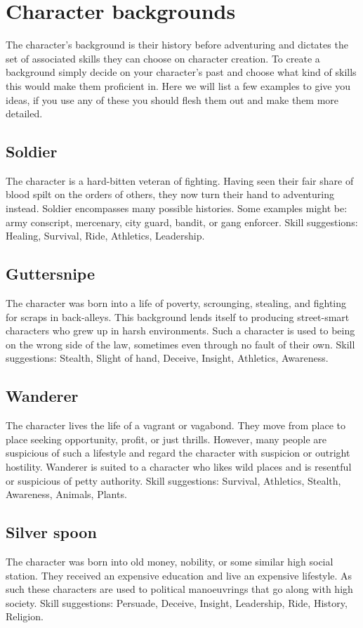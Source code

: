 \documentclass[a4paper,10pt,oneside]{book}
\begin{document}
\section{Character backgrounds}
\label{sec:backgrounds}
The character's background is their history before adventuring and dictates the set of associated skills they can choose on character creation. To create a background simply decide on your character's past and choose what kind of skills this would make them proficient in. Here we will list a few examples to give you ideas, if you use any of these you should flesh them out and make them more detailed.

\subsection{Soldier}
The character is a hard-bitten veteran of fighting. Having seen their fair share of blood spilt on the orders of others, they now turn their hand to adventuring instead. Soldier encompasses many possible histories. Some examples might be: army conscript, mercenary, city guard, bandit, or gang enforcer. Skill suggestions: Healing, Survival, Ride, Athletics, Leadership. 

\subsection{Guttersnipe}
The character was born into a life of poverty, scrounging, stealing, and fighting for scraps in back-alleys. This background lends itself to producing street-smart characters who grew up in harsh environments. Such a character is used to being on the wrong side of the law, sometimes even through no fault of their own. Skill suggestions: Stealth, Slight of hand, Deceive, Insight, Athletics, Awareness.

\subsection{Wanderer}
The character lives the life of a vagrant or vagabond. They move from place to place seeking opportunity, profit, or just thrills. However, many people are suspicious of such a lifestyle and regard the character with suspicion or outright hostility. Wanderer is suited to a character who likes wild places and is resentful or suspicious of petty authority. Skill suggestions: Survival, Athletics, Stealth, Awareness, Animals, Plants.

\subsection{Silver spoon}
The character was born into old money, nobility, or some similar high social station. They received an expensive education and live an expensive lifestyle. As such these characters are used to political manoeuvrings that go along with high society. Skill suggestions: Persuade, Deceive, Insight, Leadership, Ride, History, Religion.
\end{document}
